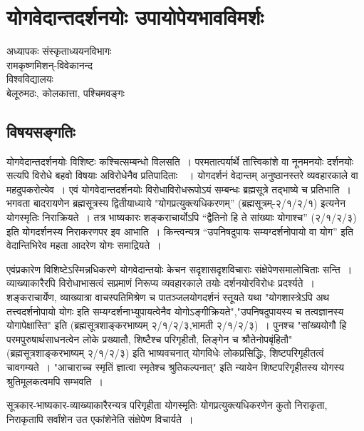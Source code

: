 {\fontsize{15}{17}\selectfont
\chapter{योगवेदान्तदर्शनयोः  उपायोपेयभावविमर्शः}

\begin{center}
\smallskip

अध्यापकः संस्कृताध्ययनविभागः\\
रामकृष्णमिशन्-विवेकानन्द\\
विश्वविद्यालयः\\
बेलूरुमठः, कोलकात्ता, पश्चिमवङ्गः
\addrule
\end{center}

\section*{विषयसङ्गतिः}

योगवेदान्तदर्शनयोः विशिष्टः कश्चित्सम्बन्धो विलसति~। परमतात्पर्यार्थे तात्त्विकांशे वा नूनमनयोः दर्शनयोः सत्यपि विरोधे बहवो विषयाः अविरोधेनैव प्रतिपादिताः~~। योगदर्शनं वेदान्तम् अनुष्ठानस्तरे व्यवहारकाले वा महदुपकरोत्येव~। एवं योगवेदान्तदर्शनयोः विरोधाविरोधरूपोऽयं सम्बन्धः ब्रह्मसूत्रे तद्भाष्ये च प्रतिभाति~। भगवता बादरायणेन ब्रह्मसूत्रस्य द्वितीयाध्याये "योगप्रत्युक्त्यधिकरणम्” (ब्रह्मसूत्रम्-२/१/२/१) इत्यनेन योगस्मृतिः निराक्रियते~। तत्र भाष्यकारः शङ्कराचार्योऽपि “द्वैतिनो हि ते सांख्याः योगाश्च” (२/१/२/३) इति योगदर्शनस्य निराकरणपर इव आभाति~। किन्त्वन्यत्र “उपनिषदुपायः सम्यग्दर्शनोपायो वा योग” इति वेदान्तिभिरेव महता आदरेण योगः समाद्रियते~। 

एवंप्रकारेण विशिष्टेऽस्मिन्नधिकरणे योगवेदान्तयोः केचन सदृशासदृशविचाराः संक्षेपेणसमालोचिताः सन्ति~। व्याख्याकारैरपि विरोधाभासत्वं सप्रमाणं निरूप्य व्यवहारकाले तयोः दर्शनयोरविरोधः प्रदर्श्यते~। शङ्कराचार्येण, व्याख्यात्रा वाचस्पतिमिश्रेण च पातञ्जलयोगदर्शनं स्तूयते यथा "योगशास्त्रेऽपि अथ तत्त्वदर्शनोपायो योगः इति सम्यग्दर्शनाभ्युपायत्वेनैव योगोऽङ्गीक्रियते","उपनिषदुपायस्य च तत्वज्ञानस्य योगापेक्षास्ति" इति (ब्रह्मसूत्रशाङ्करभाष्यम् २/१/२/३,भामती २/१/२/३)~। पुनश्च "सांख्ययोगौ हि परमपुरुषार्थसाधनत्वेन लोके प्रख्यातौ, शिष्टैश्च परिगृहीतौ, लिङ्गेन च श्रौतेनोपबृंहितौ" (ब्रह्मसूत्रशाङ्करभाष्यम् २/१/२/३) इति भाष्यवचनात् योगविधेः लोकप्रसिद्धिः, शिष्टपरिगृहीतत्वं चावगम्यते~। "आचाराच्च स्मृतिं ज्ञात्वा स्मृतेश्च श्रुतिकल्पनात्" इति न्यायेन शिष्टपरिगृहीतस्य योगस्य श्रुतिमूलकत्वमपि सम्भवति~। 

सूत्रकार-भाष्यकार-व्याख्याकारैरन्यत्र परिगृहीता योगस्मृतिः योगप्रत्युक्त्यधिकरणेन कुतो निराकृता, निराकृतापि सर्वांशेन उत एकांशेनेति संक्षेपेण विचार्यते~। 

}
